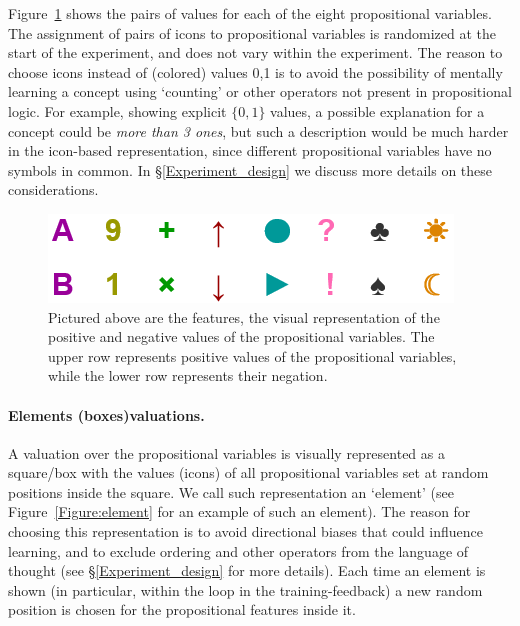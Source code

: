 Figure~\ref{Figure:references} shows the pairs of values for each of the eight propositional variables. The assignment of pairs of icons to propositional variables is randomized at the start of the experiment, and does not vary within the experiment. 
The reason to choose icons instead of (colored) values 0,1 is to avoid the possibility of mentally learning a concept using `counting' or other operators not present in propositional logic. For example, showing explicit $\{0,1\}$ values, a possible explanation for a concept could be {\em more than 3 ones}, but such a description would be much harder in the icon-based representation, since different propositional variables have no symbols in common. In \S\ref{Experiment_design} we discuss more details on these considerations.

\begin{figure}[h!]
\begin{center}
    	\includegraphics[scale=2]{papers/images_behavior_research_methods/Features8.png}
	\caption{Pictured above are the features, the visual representation of the positive and negative values of the propositional variables. The upper row represents positive values of the propositional variables, while the lower row represents their negation.}
	 \label{Figure:references}
\end{center}
\end{figure}


\paragraph{Elements (boxes)\textemdash valuations.} A valuation over the propositional variables is visually represented as a square/box with the values (icons) of all propositional variables set at random positions inside the square. We call such representation an `element' (see Figure~\ref{Figure:element} for an example of such an element). The reason for choosing this representation is to avoid directional biases that could influence learning, and to exclude ordering and other operators from the language of thought (see \S\ref{Experiment_design} for more details). 
Each time an element is shown (in particular, within the loop in the training-feedback) a new random position is chosen for the propositional features inside it.
%

